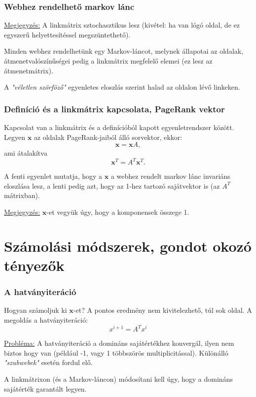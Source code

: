 \documentclass[]{beamer}
\newcommand{\bx}{\mathbf{x}}
\begin{document}
\begin{frame}
	\frametitle{Webhez rendelhető markov lánc}
	
	\underline{Megjegyzés:} A linkmátrix sztochasztikus lesz (kivétel: ha van lógó oldal, de ez egyszerű helyettesítéssel megszüntethető).
	
	\bigskip
	
	Minden webhez rendelhetünk egy Markov-láncot, melynek állapotai az oldalak, átmenetvalószínűségei pedig a linkmátrix megfelelő elemei (ez lesz az átmenetmátrix). 
	
	\bigskip
	
	A \textit{"véletlen szörföző"} egyenletes eloszlás szerint halad az oldalon lévő linkeken. 
\end{frame}

\begin{frame}
	\frametitle{Definíció és a linkmátrix kapcsolata, PageRank vektor}
	
	Kapcsolat van a linkmátrix és a definícióból kapott egyenletrendszer között. Legyen $\bx$ az oldalak PageRank-jaiból álló sorvektor, ekkor:
	\[ 
	\bx = \bx A, 
	\]
	ami átalakítva
	\[
	\bx^T = A^T \bx^T. 
	\]
	
	A fenti egyenlet mutatja, hogy a $\bx$ a webhez rendelt markov lánc invariáns eloszlása lesz, a lenti pedig azt, hogy az 1-hez
	tartozó sajátvektor is (az $A^T$ mátrixban).
	
	\bigskip
	\underline{Megjegyzés:} $\bx$-et vegyük úgy, hogy a komponensek összege 1.
\end{frame}

\section{Számolási módszerek, gondot okozó tényezők}

\begin{frame}
	\frametitle{A hatványiteráció}
	
	Hogyan számoljuk ki $\bx$-et? A pontos eredmény nem kivitelezhető, túl sok oldal. A megoldás a hatványiteráció:
	\[ x^{i+1} = A^T x^i \]
	
	\underline{Probléma:} A hatványiteráció a domináns sajátértékhez konvergál, ilyen nem biztos hogy van (például -1, vagy 1 többszörös multiplicitással). Különálló \textit{"szubwebek"} esetén fordul elő.
	
	\bigskip
	A linkmátrixon (és a Markov-láncon) módosítani kell úgy, hogy a domináns sajátérték garantált legyen.
\end{frame}
\end{document}
